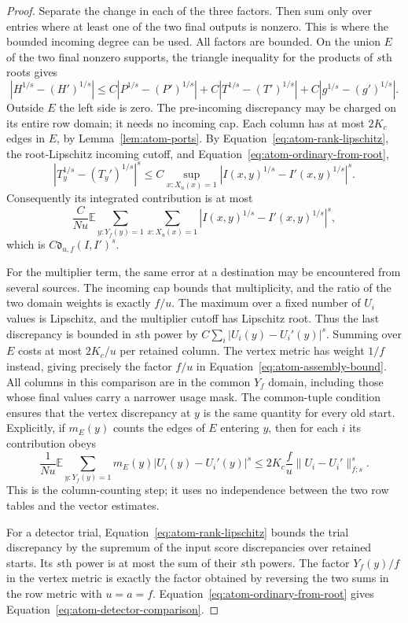 \begin{proof}
Separate the change in each of the three factors. Then sum only over entries where at least one of the two final outputs is nonzero. This is where the bounded incoming degree can be used. All factors are bounded. On the union $E$ of the two final nonzero
supports, the triangle inequality for the products of $s$th roots gives
\[
 |H^{1/s}-(H')^{1/s}|
 \le C|P^{1/s}-(P')^{1/s}|
     +C|T^{1/s}-(T')^{1/s}|
     +C|g^{1/s}-(g')^{1/s}|.
\]
Outside $E$ the left side is zero.  The pre-incoming discrepancy may be
charged on its entire row domain; it needs no incoming cap.  Each column
has at most $2K_c$ edges in $E$, by Lemma~\ref{lem:atom-ports}.
By Equation~\eqref{eq:atom-rank-lipschitz}, the root-Lipschitz incoming
cutoff, and Equation~\eqref{eq:atom-ordinary-from-root},
\[
 |T_y^{1/s}-(T_y')^{1/s}|^s
 \le C\sup_{x:X_u(x)=1}
            |I(x,y)^{1/s}-I'(x,y)^{1/s}|^s.
\]
Consequently its integrated contribution is at most
\[
 \frac C{Nu}\mathbb E\sum_{y:Y_f(y)=1}
              \sum_{x:X_u(x)=1}
              |I(x,y)^{1/s}-I'(x,y)^{1/s}|^s,
\]
which is $C\mathfrak d_{u,f}(I,I')^s$.

For the multiplier term, the same error at a destination may be encountered from several sources. The incoming cap bounds that multiplicity, and the ratio of the two domain weights is exactly $f/u$. The maximum over a fixed number of $U_i$ values is Lipschitz, and the
multiplier cutoff has Lipschitz root.  Thus the last discrepancy is
bounded in $s$th power by $C\sum_i|U_i(y)-U_i'(y)|^s$.
Summing over $E$ costs at most $2K_c/u$ per retained column.  The vertex
metric has weight $1/f$ instead, giving precisely the factor $f/u$ in
Equation~\eqref{eq:atom-assembly-bound}.  All columns in this comparison
are in the common $Y_f$ domain, including those whose final values carry
a narrower usage mask.  The common-tuple condition ensures that the
vertex discrepancy at $y$ is the same quantity for every old start.
Explicitly, if $m_E(y)$ counts the edges of $E$ entering $y$, then for
each $i$ its contribution obeys
\[
 \frac1{Nu}\mathbb E\sum_{y:Y_f(y)=1}
       m_E(y)|U_i(y)-U_i'(y)|^s
 \le 2K_c\frac fu\|U_i-U_i'\|_{f;s}^s.
\]
This is the column-counting step; it uses no independence between the
two row tables and the vector estimates.

For a detector trial, Equation~\eqref{eq:atom-rank-lipschitz} bounds the
trial discrepancy by the supremum of the input score discrepancies over
retained starts.  Its $s$th power is at most the sum of their $s$th powers.
The factor $Y_f(y)/f$ in the vertex metric is exactly the factor obtained
by reversing the two sums in the row metric with $u=a=f$.
Equation~\eqref{eq:atom-ordinary-from-root} gives
Equation~\eqref{eq:atom-detector-comparison}.
\end{proof}

